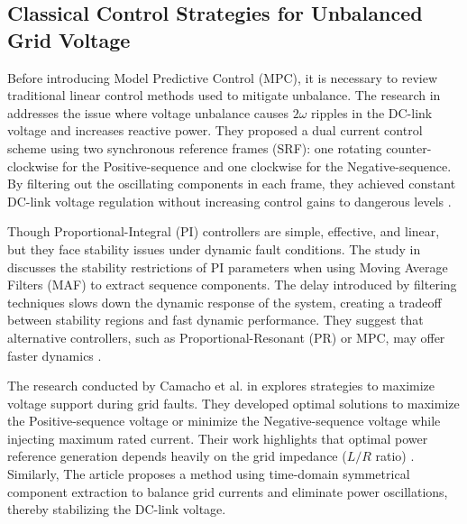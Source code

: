 \subsection{Classical Control Strategies for Unbalanced Grid Voltage}
Before introducing Model Predictive Control (MPC), it is necessary to review traditional linear control methods 
used to mitigate unbalance. The research in \cite{song1999} addresses the issue where voltage unbalance causes $2\omega$ 
ripples in the DC-link voltage and increases reactive power. They proposed a dual current control scheme using two 
synchronous reference frames (SRF): one rotating counter-clockwise for the Positive-sequence and one clockwise for 
the Negative-sequence. By filtering out the oscillating components in each frame, they achieved constant DC-link 
voltage regulation without increasing control gains to dangerous levels \cite{song1999}.\par
Though Proportional-Integral (PI) controllers are simple, effective, and linear, but they face stability issues
under dynamic fault conditions. The study in \cite{mirhosseini2013} discusses the stability restrictions of PI 
parameters when using Moving Average Filters (MAF) to extract sequence components. The delay introduced by
filtering techniques slows down the dynamic response of the system, creating a tradeoff between stability regions
and fast dynamic performance. They suggest that alternative controllers, such as Proportional-Resonant (PR) or MPC,
may offer faster dynamics \cite{mirhosseini2013}.\par
The research conducted by Camacho et al. in \cite{camacho2016} explores strategies to maximize voltage support during 
grid faults. They developed optimal solutions to maximize the Positive-sequence voltage or minimize the Negative-sequence
voltage while injecting maximum rated current. Their work highlights that optimal power reference generation depends
heavily on the grid impedance ($L/R$ ratio) \cite{camacho2016}. Similarly, The article \cite{alathamneh2022} proposes
a method using time-domain symmetrical component extraction to balance grid currents and eliminate power oscillations,
thereby stabilizing the DC-link voltage.\par
